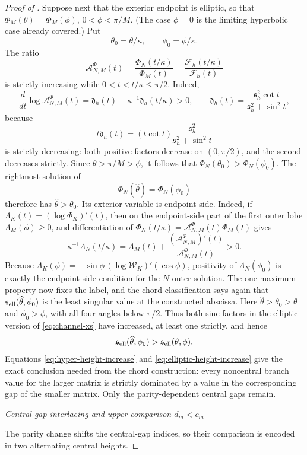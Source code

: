 \documentclass[12pt,anonymous]{iopjournal}
\numberwithin{equation}{section}
\theoremstyle{remark}
\newcommand{\proofstage}[1]{%
  \par\medskip\noindent\textit{#1}\par\nobreak\smallskip}
\begin{document}
\begin{proof}[Proof of ]
Suppose next that the exterior endpoint is elliptic, so that
\(\Phi_M(\theta)=\Phi_M(\phi)\), \(0<\phi<\pi/M\).  (The case
\(\phi=0\)
is the limiting hyperbolic case already covered.)  Put
\[
 \theta_0=\theta/\kappa,\qquad \phi_0=\phi/\kappa.
\]
The ratio
\[
 \mathcal A_{N,M}^{\Phi}(t)
 =\frac{\Phi_N(t/\kappa)}{\Phi_M(t)}
 =\frac{\mathcal F_h(t/\kappa)}{\mathcal F_h(t)}
\]
is strictly increasing while \(0<t<t/\kappa\leq\pi/2\).  Indeed,
\[
 \frac{d}{dt}\log\mathcal A_{N,M}^{\Phi}(t)
 =\mathfrak d_h(t)-\kappa^{-1}\mathfrak d_h(t/\kappa)>0,\qquad
 \mathfrak d_h(t)=\frac{\mathfrak s_h^2\cot t}
 {\mathfrak s_h^2+\sin^2t},
\]
because
\[
 t\mathfrak d_h(t)=(t\cot t)
 \frac{\mathfrak s_h^2}{\mathfrak s_h^2+\sin^2t}
\]
is strictly decreasing: both positive factors decrease on
\((0,\pi/2)\), and the second decreases strictly.  Since
\(\theta>\pi/M>\phi\), it follows that
\(\Phi_N(\theta_0)>\Phi_N(\phi_0)\).  The rightmost solution of
\[
 \Phi_N(\widehat\theta)=\Phi_N(\phi_0)
\]
therefore has \(\widehat\theta>\theta_0\).  Its exterior variable is
endpoint-side.  Indeed, if
\(\Lambda_K(t)=(\log\Phi_K)'(t)\), then on the
endpoint-side part of the first outer lobe
\(\Lambda_M(\phi)\geq0\), and differentiation of
\(\Phi_N(t/\kappa)=\mathcal A_{N,M}^{\Phi}(t)\Phi_M(t)\) gives
\[
 \kappa^{-1}\Lambda_N(t/\kappa)
 =\Lambda_M(t)
 +\frac{(\mathcal A_{N,M}^{\Phi})'(t)}{\mathcal A_{N,M}^{\Phi}(t)}>0.
\]
Because
\(\Lambda_K(\phi)=-\sin\phi\,(\log\mathcal W_K)'(\cos\phi)\),
positivity of \(\Lambda_N(\phi_0)\) is exactly the endpoint-side
condition for the
\(N\)-outer solution.  The one-maximum property now fixes the label, and the chord
classification says again that
\(\mathfrak s_{\rm ell}(\widehat\theta,\phi_0)\) is the least singular
value at the constructed abscissa.  Here
\(\widehat\theta>\theta_0>\theta\) and \(\phi_0>\phi\), with all four
angles below \(\pi/2\).  Thus both sine factors in the elliptic version
of \eqref{eq:channel-xs} have increased, at least one strictly, and hence
\begin{equation}\label{eq:elliptic-height-increase}
 \mathfrak s_{\rm ell}(\widehat\theta,\phi_0)
 >\mathfrak s_{\rm ell}(\theta,\phi).
\end{equation}
Equations \eqref{eq:hyper-height-increase} and
\eqref{eq:elliptic-height-increase} give the exact conclusion needed from
the chord construction: every noncentral branch value for the larger matrix
is strictly dominated by a value in the corresponding gap of the smaller
matrix.  Only the parity-dependent central gaps remain.

\proofstage{Central-gap interlacing and upper comparison \(d_m<c_m\)}
The parity change shifts the central-gap indices, so their comparison is
encoded in two alternating central heights.


\end{proof}
\end{document}
